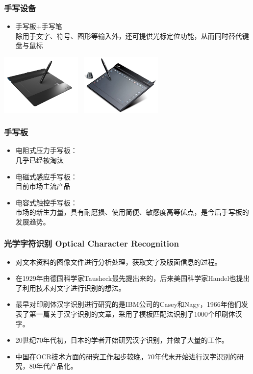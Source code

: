 \documentclass{beamer}
\begin{document}
\begin{frame}
	\frametitle{手写设备}
	\begin{itemize}
		\item 手写板+手写笔\\
		{\tiny 除用于文字、符号、图形等输入外，还可提供光标定位功能，从而同时替代键盘与鼠标}
	\end{itemize}
	\begin{center}
		\includegraphics[width=4cm]{images/drawing-pad-hanwang.jpg}~
		\includegraphics[width=4cm]{images/drawing-pad-mengtian.jpg}
	\end{center}
\end{frame}

\begin{frame}
	\frametitle{手写板}
	\begin{itemize}
		\item 电阻式压力手写板：\\{\tiny 几乎已经被淘汰}
		\item 电磁式感应手写板：\\{\tiny 目前市场主流产品}
		\item 电容式触控手写板：\\{\tiny 市场的新生力量，具有耐磨损、使用简便、敏感度高等优点，是今后手写板的发展趋势。}
	\end{itemize}
\end{frame}

\begin{frame}
	\frametitle{光学字符识别 Optical Character Recognition}
	\beamertemplatetransparentcovereddynamicmedium
	\begin{itemize}[<+->]
		\item 对文本资料的图像文件进行分析处理，获取文字及版面信息的过程。
		\item 在1929年由德国科学家Tausheck最先提出来的，后来美国科学家Handel也提出了利用技术对文字进行识别的想法。
		\item 最早对印刷体汉字识别进行研究的是IBM公司的Casey和Nagy，1966年他们发表了第一篇关于汉字识别的文章，采用了模板匹配法识别了1000个印刷体汉字。
		\item 20世纪70年代初，日本的学者开始研究汉字识别，并做了大量的工作。
		\item 中国在OCR技术方面的研究工作起步较晚，70年代末开始进行汉字识别的研究，80年代产品化。
	\end{itemize}
\end{frame}
\end{document}
